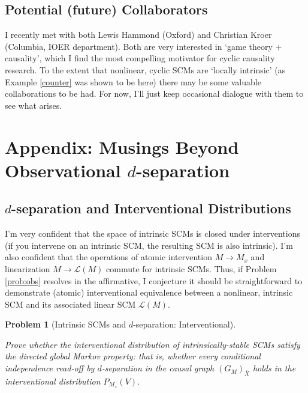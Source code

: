 \documentclass[letterpaper,10pt]{article}
\newtheorem{problem}{Problem}
\begin{document}
\subsection{Potential (future) Collaborators}

I recently met with both Lewis Hammond (Oxford) and Christian Kroer (Columbia, IOER department). Both are very interested in `game theory + causality', which I find the most compelling motivator for cyclic causality research. To the extent that nonlinear, cyclic SCMs are `locally intrinsic' (as Example \ref{counter} was shown to be here) there may be some valuable collaborations to be had. For now, I'll just keep occasional dialogue with them to see what arises.






\section{Appendix: Musings Beyond Observational $d$-separation}

\subsection{$d$-separation and Interventional Distributions} \label{speculation}

I’m very confident that the space of intrinsic SCMs is closed under interventions (if you intervene on an intrinsic SCM, the resulting SCM is also intrinsic).
I’m also confident that the operations of atomic intervention $M\rightarrow M_x$ and linearization $M\rightarrow \mathcal{L}(M)$ commute for intrinsic SCMs.
Thus, if Problem \ref{prob:obs} resolves in the affirmative, I conjecture it should be straightforward to demonstrate (atomic) interventional equivalence between a nonlinear, intrinsic SCM and its associated linear SCM $\mathcal{L}(M)$.

\begin{problem}[Intrinsic SCMs and $d$-separation: Interventional]
\label{prob:int}

Prove whether the interventional distribution of intrinsically-stable SCMs satisfy the directed global Markov property: that is, whether every conditional independence read-off by $d$-separation in the causal graph $(G_M)_{\overline{X}}$ holds in the interventional distribution $P_{M_x}(V)$.
\end{problem}
\end{document}
